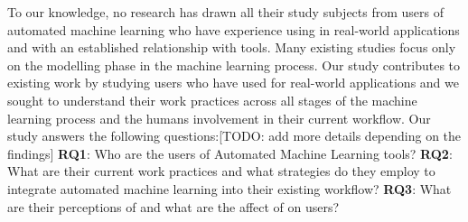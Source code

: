 To our knowledge, no research has drawn all their study subjects from users of automated machine learning who have experience using \automl in real-world applications and with an established relationship with \automl tools. Many existing studies focus only on the modelling phase in the machine learning process. Our study contributes to existing work by studying users who have used \automl for real-world applications and we sought to understand their work practices across all stages of the machine learning process and the humans involvement in their current workflow. 
Our study answers the following questions:[TODO: add more details depending on the findings]
\textbf{RQ1}: Who are the users of Automated Machine Learning tools?
\textbf{RQ2}: What are their current work practices and what strategies do they employ to integrate automated machine learning into their existing workflow?
\textbf{RQ3}: What are their perceptions of \automl and what are the affect of \automl on \automl users?














